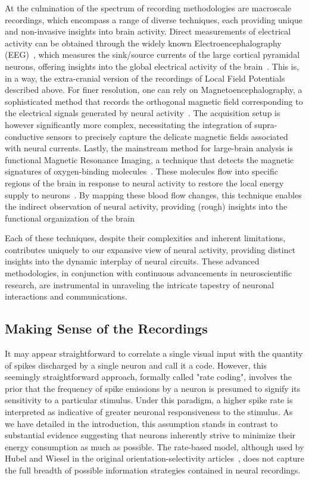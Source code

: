 At the culmination of the spectrum of recording methodologies are macroscale recordings, which encompass a range of diverse techniques, each providing unique and non-invasive insights into brain activity. Direct measurements of electrical activity can be obtained through the widely known Electroencephalography (EEG)~\cite{millett2001hans}, which measures the sink/source currents of the large cortical pyramidal neurons, offering insights into the global electrical activity of the brain~\cite{kirschstein2009source}. This is, in a way, the extra-cranial version of the recordings of Local Field Potentials described above. For finer resolution, one can rely on Magnetoencephalography, a sophisticated method that records the orthogonal magnetic field corresponding to the electrical signals generated by neural activity~\cite{hansen2010meg}. The acquisition setup is however significantly more complex, necessitating the integration of supra-conductive sensors to precisely capture the delicate magnetic fields associated with neural currents. Lastly, the mainstream method for large-brain analysis is functional Magnetic Resonance Imaging, a technique that detects the magnetic signatures of oxygen-binding molecules~\cite{worsley1995analysis,logothetis2008we}. These molecules flow into specific regions of the brain in response to neural activity to restore the local energy supply to neurons~\cite{phillips2016neurovascular}. By mapping these blood flow changes, this technique enables the indirect observation of neural activity, providing (rough) insights into the functional organization of the brain

Each of these techniques, despite their complexities and inherent limitations, contributes uniquely to our expansive view of neural activity, providing distinct insights into the dynamic interplay of neural circuits. These advanced methodologies, in conjunction with continuous advancements in neuroscientific research, are instrumental in unraveling the intricate tapestry of neuronal interactions and communications.

\subsection{Making Sense of the Recordings}
It may appear straightforward to correlate a single visual input with the quantity of spikes discharged by a single neuron and call it a code. However, this seemingly straightforward approach, formally called  "rate coding", involves the prior that the frequency of spike emissions by a neuron is presumed to signify its sensitivity to a particular stimulus. Under this paradigm, a higher spike rate is interpreted as indicative of greater neuronal responsiveness to the stimulus. As we have detailed in the introduction, this assumption stands in contrast to substantial evidence suggesting that neurons inherently strive to minimize their energy consumption as much as possible. The rate-based model, although used by Hubel and Wiesel in the original orientation-selectivity articles~\cite{hubel1959receptive, hubel1962receptive}, does not capture the full breadth of possible information strategies contained in neural recordings. 

